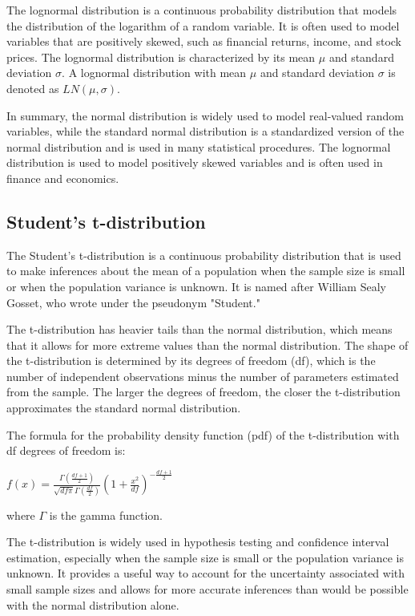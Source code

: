 \documentclass[12pt, a4paper, oneside]{article}
\begin{document}
The lognormal distribution is a continuous probability distribution that models the distribution of the logarithm of a random variable. It is often used to model variables that are positively skewed, such as financial returns, income, and stock prices. The lognormal distribution is characterized by its mean $\mu$ and standard deviation $\sigma$. A lognormal distribution with mean $\mu$ and standard deviation $\sigma$ is denoted as $LN(\mu, \sigma)$.

In summary, the normal distribution is widely used to model real-valued random variables, while the standard normal distribution is a standardized version of the normal distribution and is used in many statistical procedures. The lognormal distribution is used to model positively skewed variables and is often used in finance and economics.
\subsection{ Student’s t-distribution }
The Student's t-distribution is a continuous probability distribution that is used to make inferences about the mean of a population when the sample size is small or when the population variance is unknown. It is named after William Sealy Gosset, who wrote under the pseudonym "Student."

The t-distribution has heavier tails than the normal distribution, which means that it allows for more extreme values than the normal distribution. The shape of the t-distribution is determined by its degrees of freedom (df), which is the number of independent observations minus the number of parameters estimated from the sample. The larger the degrees of freedom, the closer the t-distribution approximates the standard normal distribution.

The formula for the probability density function (pdf) of the t-distribution with df degrees of freedom is:

$f(x) = \frac{\Gamma(\frac{df + 1}{2})}{\sqrt{df \pi} \Gamma(\frac{df}{2})} (1 + \frac{x^2}{df})^{-\frac{df + 1}{2}}$

where $\Gamma$ is the gamma function.

The t-distribution is widely used in hypothesis testing and confidence interval estimation, especially when the sample size is small or the population variance is unknown. It provides a useful way to account for the uncertainty associated with small sample sizes and allows for more accurate inferences than would be possible with the normal distribution alone.
\end{document}
